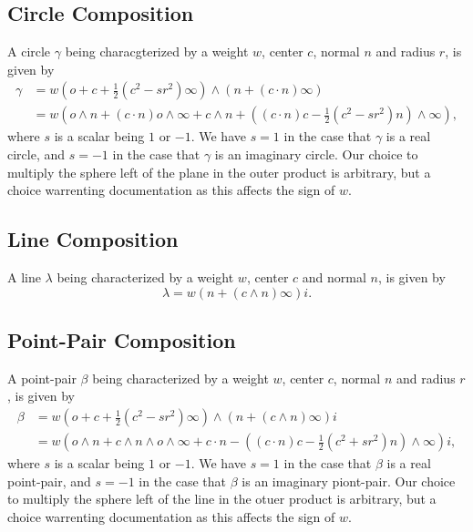 \documentclass[12pt]{article}
\newcommand{\nvao}{o}
\newcommand{\nvai}{\infty}
\begin{document}
\subsection{Circle Composition}

A circle $\gamma$ being characgterized by a weight $w$, center $c$, normal $n$
and radius $r$, is given by
\begin{align}
\gamma &=w\left(\nvao+c+\frac{1}{2}(c^2-sr^2)\nvai\right)\wedge(n+(c\cdot n)\nvai) \\
 &= w\left(\nvao\wedge n+(c\cdot n)\nvao\wedge\nvai+c\wedge n+
\left((c\cdot n)c - \frac{1}{2}(c^2-sr^2)n\right)\wedge\nvai\right),\label{equ_circle}
\end{align}
where $s$ is a scalar being $1$ or $-1$.  We have $s=1$ in the
case that $\gamma$ is a real circle, and $s=-1$ in the case that
$\gamma$ is an imaginary circle.  Our choice to multiply the sphere
left of the plane in the outer product is arbitrary, but a choice
warrenting documentation as this affects the sign of $w$.

\subsection{Line Composition}

A line $\lambda$ being characterized by a weight $w$, center $c$ and normal $n$, is
given by
\begin{equation}\label{equ_line}
\lambda = w\left(n + (c\wedge n)\nvai\right)i.
\end{equation}

\subsection{Point-Pair Composition}

A point-pair $\beta$ being characterized by a weight $w$, center $c$, normal $n$
and radius $r$, is given by
\begin{align}
\beta &= w\left(\nvao + c + \frac{1}{2}(c^2-sr^2)\nvai\right)\wedge(n+(c\wedge n)\nvai)i \\
 &= w\left(\nvao\wedge n+c\wedge n\wedge\nvao\wedge\nvai + c\cdot n -
\left((c\cdot n)c-\frac{1}{2}(c^2+sr^2)n\right)\wedge\nvai\right)i,\label{equ_pointpair}
\end{align}
where $s$ is a scalar being $1$ or $-1$.  We have $s=1$ in the case
that $\beta$ is a real point-pair, and $s=-1$ in the case that $\beta$ is an imaginary piont-pair.
Our choice to multiply the sphere left of the line in the otuer product is arbitrary, but a
choice warrenting documentation as this affects the sign of $w$.
\end{document}
